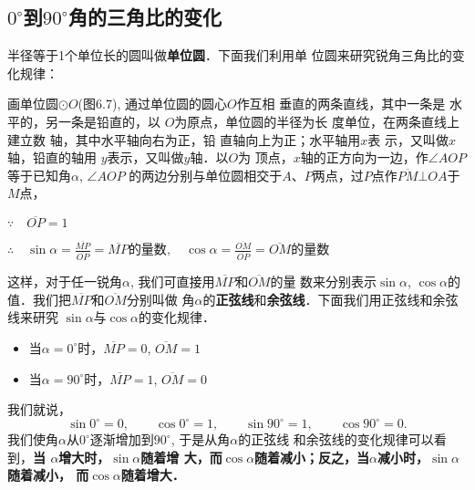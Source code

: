 \subsection{$0^{\circ}$到$90^{\circ}$角的三角比的变化}
半径等于1个单位长的圆叫做\textbf{单位圆}．下面我们利用单
位圆来研究锐角三角比的变化规律：

\begin{figure}[htp]
    \centering
{}
    \caption{}
\end{figure}


画单位圆$\odot O$(图6.7), 通过单位圆的圆心$O$作互相
垂直的两条直线，其中一条是
水平的，另一条是铅直的，以
$O$为原点，单位圆的半径为长
度单位，在两条直线上建立数
轴，其中水平轴向右为正，铅
直轴向上为正；水平轴用$x$表
示，又叫做$x$轴，铅直的轴用
$y$表示，又叫做$y$轴．以$O$为
顶点，$x$轴的正方向为一边，作$\angle AOP$等于已知角$\alpha$, $\angle AOP$
的两边分别与单位圆相交于$A$、$P$两点，过$P$点作$\overline{PM}\bot OA$于$M$点，

$\because\quad \overline{OP}=1$

$\therefore\quad \sin\alpha=\frac{\overline{MP}}{\overline{OP}}=\overline{MP}\text{的量数},\quad \cos\alpha=\frac{\overline{OM}}{\overline{OP}}=\overline{OM}\text{的量数}$

这样，对于任一锐角$\alpha$, 我们可直接用$\overline{MP}$和$\overline{OM}$的量
数来分别表示$\sin\alpha$, $\cos\alpha$的值．我们把$\overline{MP}$和$\overline{OM}$分别叫做
角$\alpha$的\textbf{正弦线}和\textbf{余弦线}．下面我们用正弦线和余弦线来研究
$\sin\alpha$与$\cos\alpha$的变化规律．

\begin{itemize}
\item 当$\alpha=0^{\circ}$时，$\overline{MP}=0$, 
$\overline{OM}=1$
\item 当$\alpha=90^{\circ}$时，$\overline{MP}=1$, 
$\overline{OM}=0$
\end{itemize}
我们就说，
\[\sin0^{\circ}=0,\qquad
\cos0^{\circ}=1,\qquad
\sin90^{\circ}=1,\qquad
\cos90^{\circ}=0.\]
我们使角$\alpha$从$0^{\circ}$逐渐增加到$90^{\circ}$, 于是从角$\alpha$的正弦线
和余弦线的变化规律可以看到，\textbf{当
$\alpha$增大时，$\sin\alpha$随着增
大，而$\cos\alpha$随着减小；反之，当$\alpha$减小时，$\sin\alpha$随着减小，
而$\cos\alpha$随着增大．}

